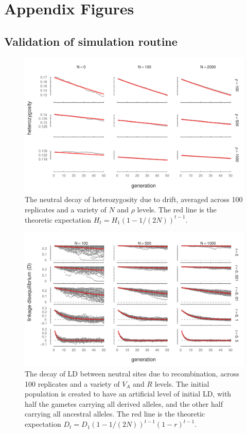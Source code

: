 \documentclass[11pt]{article}
\begin{document}
\setcounter{figure}{0}    

\newpage
\section{Appendix Figures}

\subsection{Validation of simulation routine}

\begin{figure}[!ht]
  \centering
  \includegraphics{./images/supp-het-neutral.pdf}

\caption{The neutral decay of heterozygosity due to drift, averaged across 100
replicates and a variety of $N$ and $\rho$ levels. The red line is the
theoretic expectation $H_t = H_1 (1-1/(2N))^{t-1}$.}

\label{fig:het-neut}
\end{figure}


\begin{figure}[!ht]
  \centering
  \includegraphics{./images/supp-ld-neutral.pdf}

  \caption{The decay of LD between neutral sites due to recombination, across
    100 replicates and a variety of $V_A$ and $R$ levels. The initial
    population is created to have an artificial level of initial LD, with half
    the gametes carrying all derived alleles, and the other half carrying all
  ancestral alleles. The red line is the theoretic expectation $D_t = D_1 (1-1/(2N))^{t-1} (1-r)^{t-1}$.}

  \label{fig:ld-neut}
\end{figure}
\end{document}
